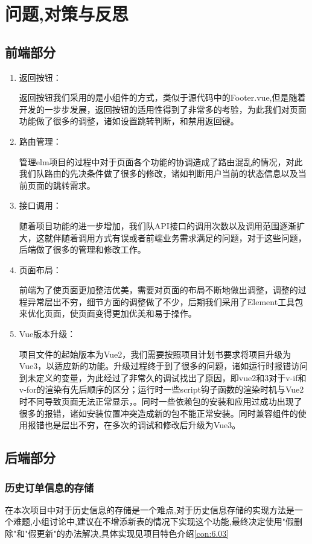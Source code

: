 \chapter{问题,对策与反思}
\section{前端部分}
\begin{enumerate}
    \item  返回按钮：\par
    返回按钮我们采用的是小组件的方式，类似于源代码中的Footer.vue,但是随着开发的一步步发展，返回按钮的适用性得到了非常多的考验，为此我们对页面功能做了很多的调整，诸如设置跳转判断，和禁用返回键。
    \item  路由管理：\par
    管理elm项目的过程中对于页面各个功能的协调造成了路由混乱的情况，对此我们队路由的先决条件做了很多的修改，诸如判断用户当前的状态信息以及当前页面的跳转需求。
    \item  接口调用：\par
    随着项目功能的进一步增加，我们队API接口的调用次数以及调用范围逐渐扩大，这就伴随着调用方式有误或者前端业务需求满足的问题，对于这些问题，后端做了很多的管理和修改工作。
    \item  页面布局：\par
    前端为了使页面更加整洁优美，需要对页面的布局不断地做出调整，调整的过程异常层出不穷，细节方面的调整做了不少，后期我们采用了Element工具包来优化页面，使页面变得更加优美和易于操作。
    \item  Vue版本升级：\par
    项目文件的起始版本为Vue2，我们需要按照项目计划书要求将项目升级为Vue3，以适应新的功能。升级过程终于到了很多的问题，诸如运行时报错访问到未定义的变量，为此经过了非常久的调试找出了原因，即vue2和3对于v-if和v-for的渲染有先后顺序的区分；运行时一些script钩子函数的渲染时机与Vue2时不同导致页面无法正常显示，。同时一些依赖包的安装和应用过成功出现了很多的报错，诸如安装位置冲突造成新的包不能正常安装。同时兼容组件的使用报错也是层出不穷，在多次的调试和修改后升级为Vue3。
\end{enumerate}
\section{后端部分}
\subsection{历史订单信息的存储}
在本次项目中对于历史信息的存储是一个难点,对于历史信息存储的实现方法是一个难题,小组讨论中,建议在不增添新表的情况下实现这个功能,最终决定使用"假删除"和"假更新"的办法解决,具体实现见项目特色介绍\ref{con:6.03}

